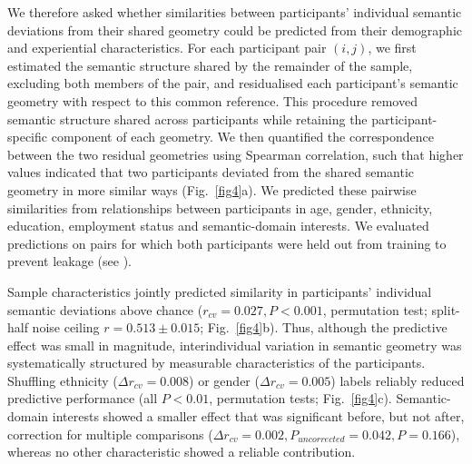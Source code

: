 \documentclass[pdflatex,sn-mathphys]{sn-jnl}
\begin{document}
We therefore asked whether similarities between participants' individual semantic deviations from their shared geometry could be predicted from their demographic and experiential characteristics. For each participant pair $(i, j)$, we first estimated the semantic structure shared by the remainder of the sample, excluding both members of the pair, and residualised each participant's semantic geometry with respect to this common reference. This procedure removed semantic structure shared across participants while retaining the participant-specific component of each geometry. We then quantified the correspondence between the two residual geometries using Spearman correlation, such that higher values indicated that two participants deviated from the shared semantic geometry in more similar ways (Fig.~\ref{fig4}a). We predicted these pairwise similarities from relationships between participants in age, gender, ethnicity, education, employment status and semantic-domain interests. We evaluated predictions on pairs for which both participants were held out from training to prevent leakage (see ). 

Sample characteristics jointly predicted similarity in participants' individual semantic deviations above chance ($r_{cv} = 0.027, P < 0.001$, permutation test; split-half noise ceiling $r = 0.513\pm0.015$; Fig.~\ref{fig4}b). Thus, although the predictive effect was small in magnitude, interindividual variation in semantic geometry was systematically structured by measurable characteristics of the participants. Shuffling ethnicity ($\Delta r_{cv} = 0.008$) or gender ($\Delta r_{cv} = 0.005$) labels reliably reduced predictive performance (all $P < 0.01$, permutation tests; Fig.~\ref{fig4}c). Semantic-domain interests showed a smaller effect that was significant before, but not after, correction for multiple comparisons ($\Delta r_{cv} = 0.002, P_{uncorrected} = 0.042, P = 0.166$), whereas no other characteristic showed a reliable contribution. 
\end{document}
